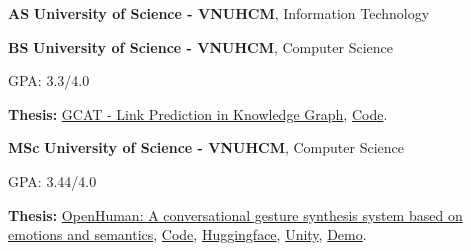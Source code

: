

\begin{threecolentry}{\textbf{AS}}{
	}
	\textbf{University of Science - VNUHCM}, Information Technology
\end{threecolentry}

\begin{threecolentry}{\textbf{BS}}{
	}
	\textbf{University of Science - VNUHCM}, Computer Science
	\begin{highlights}
		\item GPA: 3.3/4.0
		\item \textbf{Thesis:} \href{https://hmthanh.github.io/file/Link_Prediction_In_Knowledge_Graph.pdf}{GCAT - Link Prediction in Knowledge Graph}, \href{https://github.com/hmthanh/GCAT}{Code}.
	\end{highlights}
\end{threecolentry}

\begin{threecolentry}{\textbf{MSc}}{
	}
	\textbf{University of Science - VNUHCM}, Computer Science
	\begin{highlights}
		\item GPA: 3.44/4.0
		\item \textbf{Thesis:} \href{https://hmthanh.github.io/file/OpenHuman-A_conversational_gesture_synthesis_system_based_on_emotions_and_semantics.pdf}{OpenHuman: A conversational gesture synthesis system based on emotions and semantics},
		\href{https://github.com/hmthanh/OHGesture}{Code}, \href{https://huggingface.co/openhuman/openhuman}{Huggingface}, \href{https://github.com/DeepGesture/deepgesture-unity}{Unity}, \href{https://youtu.be/yLwXdm7UgPE}{Demo}.
	\end{highlights}
\end{threecolentry}